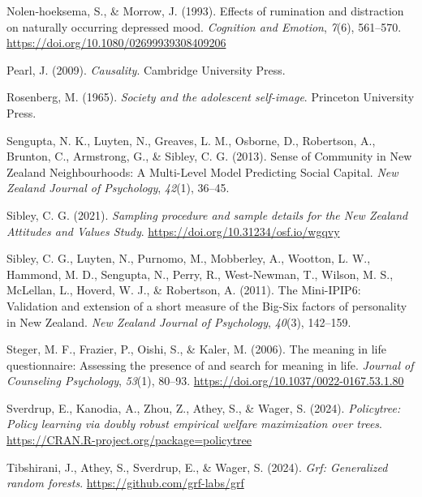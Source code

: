 \documentclass[
  single column]{article}
\newlength{\cslhangindent}
\newenvironment{CSLReferences}[2] %
 {\begin{list}{}{%
  \setlength{\itemindent}{0pt}
  \setlength{\leftmargin}{0pt}
  \setlength{\parsep}{0pt}
  \ifodd #1
   \setlength{\leftmargin}{\cslhangindent}
   \setlength{\itemindent}{-1\cslhangindent}
  \fi
  \setlength{\itemsep}{#2\baselineskip}}}
 {\end{list}}
\begin{document}
\begin{CSLReferences}{1}{0}
Nolen-hoeksema, S., \& Morrow, J. (1993). Effects of rumination and
distraction on naturally occurring depressed mood. \emph{Cognition and
Emotion}, \emph{7}(6), 561--570.
\url{https://doi.org/10.1080/02699939308409206}

Pearl, J. (2009). \emph{Causality}. Cambridge University Press.

Rosenberg, M. (1965). \emph{Society and the adolescent self-image}.
Princeton University Press.

Sengupta, N. K., Luyten, N., Greaves, L. M., Osborne, D., Robertson, A.,
Brunton, C., Armstrong, G., \& Sibley, C. G. (2013). Sense of Community
in {N}ew {Z}ealand Neighbourhoods: A Multi-Level Model Predicting Social
Capital. \emph{New Zealand Journal of Psychology}, \emph{42}(1), 36--45.

Sibley, C. G. (2021). \emph{Sampling procedure and sample details for
the {N}ew {Z}ealand {A}ttitudes and {V}alues {S}tudy}.
\url{https://doi.org/10.31234/osf.io/wgqvy}

Sibley, C. G., Luyten, N., Purnomo, M., Mobberley, A., Wootton, L. W.,
Hammond, M. D., Sengupta, N., Perry, R., West-Newman, T., Wilson, M. S.,
McLellan, L., Hoverd, W. J., \& Robertson, A. (2011). The Mini-IPIP6:
Validation and extension of a short measure of the Big-Six factors of
personality in {N}ew {Z}ealand. \emph{New Zealand Journal of
Psychology}, \emph{40}(3), 142--159.

Steger, M. F., Frazier, P., Oishi, S., \& Kaler, M. (2006). The meaning
in life questionnaire: Assessing the presence of and search for meaning
in life. \emph{Journal of Counseling Psychology}, \emph{53}(1), 80--93.
\url{https://doi.org/10.1037/0022-0167.53.1.80}

Sverdrup, E., Kanodia, A., Zhou, Z., Athey, S., \& Wager, S. (2024).
\emph{Policytree: Policy learning via doubly robust empirical welfare
maximization over trees}.
\url{https://CRAN.R-project.org/package=policytree}

Tibshirani, J., Athey, S., Sverdrup, E., \& Wager, S. (2024). \emph{Grf:
Generalized random forests}. \url{https://github.com/grf-labs/grf}


\end{CSLReferences}
\end{document}
